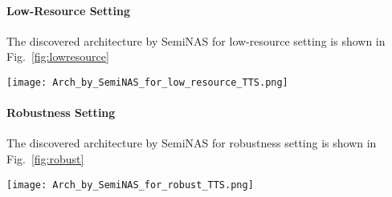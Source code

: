 \documentclass{article}
\begin{document}
\paragraph{Low-Resource Setting}
The discovered architecture by SemiNAS for low-resource setting is shown in Fig.~\ref{fig:lowresource}
\begin{figure*}[htbp]
    \centering
    \texttt{[image: Arch\_by\_SemiNAS\_for\_low\_resource\_TTS.png]}
    \caption{Architecture for low-resource setting discovered by SemiNAS.}
    \label{fig:lowresource}
\end{figure*}

\paragraph{Robustness Setting}
The discovered architecture by SemiNAS for robustness setting is shown in Fig.~\ref{fig:robust}
\begin{figure*}[htbp]
    \centering
    \texttt{[image: Arch\_by\_SemiNAS\_for\_robust\_TTS.png]}
    \caption{Architecture for robustness setting discovered by SemiNAS.}
    \label{fig:robust}
\end{figure*}
\end{document}
